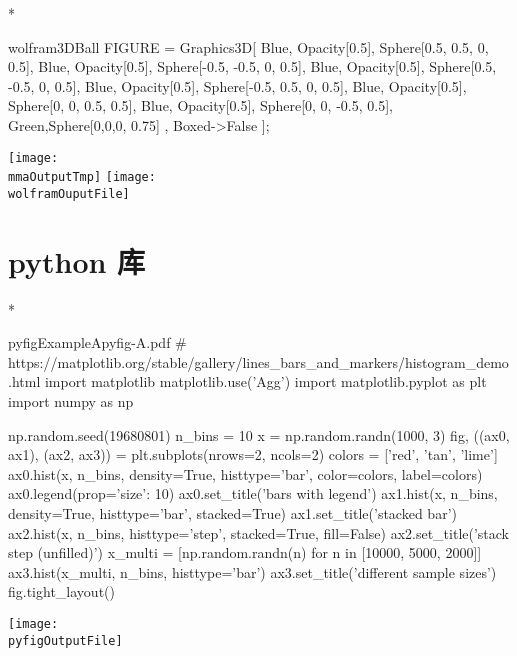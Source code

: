 \documentclass[hyper, lang=cn]{ztex}
\newcounter{DocExample}
\def\mintLang{tex}
\begin{document}
\begin{DocExample}*
\edef\mmaOutputTmp{\wolframOuputFile}

\begin{wolframGraphics}{wolfram3DBall}
FIGURE = Graphics3D[{
    Blue, Opacity[0.5], Sphere[{0.5, 0.5, 0}, 0.5],
    Blue, Opacity[0.5], Sphere[{-0.5, -0.5, 0}, 0.5],
    Blue, Opacity[0.5], Sphere[{0.5, -0.5, 0}, 0.5], 
    Blue, Opacity[0.5], Sphere[{-0.5, 0.5, 0}, 0.5],
    Blue, Opacity[0.5], Sphere[{0, 0, 0.5}, 0.5],
    Blue, Opacity[0.5], Sphere[{0, 0, -0.5}, 0.5],
    Green,Sphere[{0,0,0}, 0.75]
  }, Boxed->False
];
\end{wolframGraphics}
\texttt{[image: \\mmaOutputTmp]}\qquad
\texttt{[image: \\wolframOuputFile]}
\end{DocExample}


\clearpage
\section{python 库}
\begin{DocExample}*
\begin{pyfig}{pyfigExampleA}{pyfig-A.pdf}
# https://matplotlib.org/stable/gallery/lines_bars_and_markers/histogram_demo.html
import matplotlib
matplotlib.use('Agg')
import matplotlib.pyplot as plt
import numpy as np

np.random.seed(19680801)
n_bins = 10
x = np.random.randn(1000, 3)
fig, ((ax0, ax1), (ax2, ax3)) = plt.subplots(nrows=2, ncols=2)
colors = ['red', 'tan', 'lime']
ax0.hist(x, n_bins, density=True, histtype='bar', color=colors, label=colors)
ax0.legend(prop={'size': 10})
ax0.set_title('bars with legend')
ax1.hist(x, n_bins, density=True, histtype='bar', stacked=True)
ax1.set_title('stacked bar')
ax2.hist(x, n_bins, histtype='step', stacked=True, fill=False)
ax2.set_title('stack step (unfilled)')
x_multi = [np.random.randn(n) for n in [10000, 5000, 2000]]
ax3.hist(x_multi, n_bins, histtype='bar')
ax3.set_title('different sample sizes')
fig.tight_layout()
\end{pyfig}
\texttt{[image: \\pyfigOutputFile]}
\end{DocExample}
\end{document}
